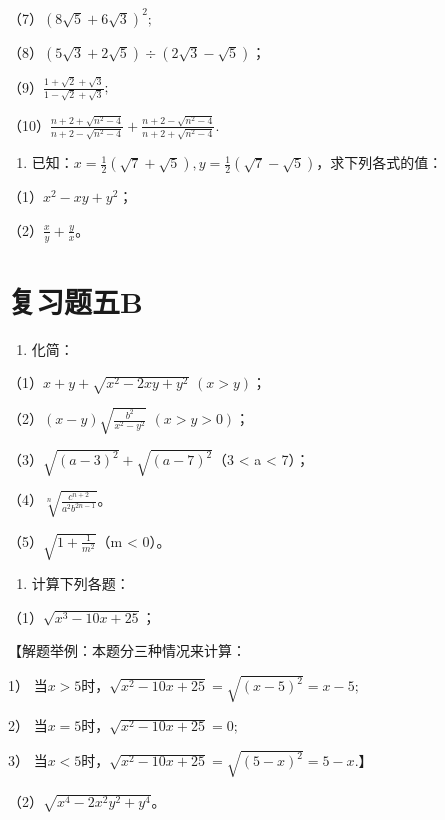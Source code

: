（7）\((8\sqrt{5} + 6\sqrt{3})^2;\)

（8）\((5\sqrt{3} + 2\sqrt{5}) \div (2\sqrt{3} - \sqrt{5})\)；

（9）\(\frac{1 + \sqrt{2} + \sqrt{3}}{1 - \sqrt{2} + \sqrt{3}};\)

（10）\(\frac{n + 2 + \sqrt{n^2 - 4}}{n + 2 - \sqrt{n^2 - 4}} + \frac{n + 2 - \sqrt{n^2 - 4}}{n + 2 + \sqrt{n^2 - 4}}.\)

\begin{enumerate}[start=12]
\item
  已知：\(x = \frac{1}{2} (\sqrt{7} + \sqrt{5}), y = \frac{1}{2} (\sqrt{7} - \sqrt{5})\)，求下列各式的值：
\end{enumerate}

（1）\(x^{2} - xy + y^{2}\)；

（2）\(\frac{x}{y} + \frac{y}{x}\)。

\section{复习题五B}

\begin{enumerate}
\item
  化简：
\end{enumerate}

（1）\(x + y + \sqrt{x^2 - 2xy + y^2}\) \((x > y)\)；

（2）\((x - y)\sqrt{\frac{b^2}{x^2 - y^2}}\) \((x > y > 0)\)；

（3）\(\sqrt{(a - 3)^2} + \sqrt{(a - 7)^2}\)（3 \textless{} a
\textless{} 7）；

（4）\(\sqrt[n]{\frac{c^{n+2}}{a^{2}b^{2n-1}}}\)。

（5）\(\sqrt{1 + \frac{1}{m^2}}\)（m \textless{} 0）。

\begin{enumerate}[start=2]
\item
  计算下列各题：
\end{enumerate}

（1）\(\sqrt{x^3 - 10x + 25}\)；

【解题举例：本题分三种情况来计算：

1） 当\(x > 5\)时，\(\sqrt{x^2 - 10x + 25} = \sqrt{(x - 5)^2} = x - 5;\)

2） 当\(x = 5\)时，\(\sqrt{x^2 - 10x + 25} = 0;\)

3）
当\(x < 5\)时，\(\sqrt{x^2 - 10x + 25} = \sqrt{(5 - x)^2} = 5 - x.\)】

（2）\(\sqrt{x^4 - 2x^2y^2 + y^4}\)。

